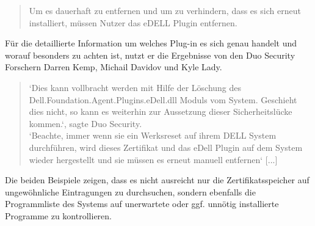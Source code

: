 \begin{quote}
	Um es dauerhaft zu entfernen und um zu verhindern, dass es sich erneut installiert, müssen Nutzer das eDELL Plugin entfernen. \cite{zdnet}
\end{quote}
Für die detaillierte Information um welches Plug-in es sich genau handelt und worauf besonders zu achten ist, nutzt er die Ergebnisse von den Duo Security Forschern Darren Kemp, Michail Davidov und Kyle Lady.
\begin{quote}
	‘Dies kann vollbracht werden mit Hilfe der Löschung des \newline Dell.Foundation.Agent.Plugins.eDell.dll Moduls vom System. Geschieht dies nicht, so kann es weiterhin zur Aussetzung dieser Sicherheitslücke kommen.‘, sagte Duo Security.
	\\
	‘Beachte, immer wenn sie ein Werksreset auf ihrem DELL System durchführen, wird dieses Zertifikat und das eDell Plugin auf dem System wieder hergestellt und sie müssen es erneut manuell entfernen‘ [...] \cite{zdnet}
\end{quote}
Die beiden Beispiele zeigen, dass es nicht ausreicht nur die Zertifikatsspeicher auf ungewöhnliche Eintragungen zu durchsuchen, sondern ebenfalls die Programmliste des Systems auf unerwartete oder ggf. unnötig installierte Programme zu kontrollieren.
